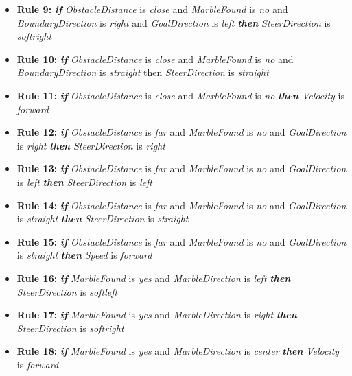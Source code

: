 \documentclass[../Head/Main.tex]{subfiles}
\begin{document}
\begin{itemize}
\item {\large \textbf{Rule 9:}} \textbf{\textit{if}} \textit{ObstacleDistance} is \textit{close} and \textit{MarbleFound} is \textit{no} and \textit{BoundaryDirection} is \textit{right} and \textit{GoalDirection} is \textit{left} \textbf{\textit{then}} \textit{SteerDirection} is \textit{softright}
 
\item {\large \textbf{Rule 10:}} \textbf{\textit{if}} \textit{ObstacleDistance} is \textit{close} and \textit{MarbleFound} is \textit{no} and \textit{BoundaryDirection} is \textit{straight} then \textit{SteerDirection} is \textit{straight}

\item {\large \textbf{Rule 11:}} \textbf{\textit{if}} \textit{ObstacleDistance} is \textit{close} and \textit{MarbleFound} is \textit{no} \textbf{\textit{then}} \textit{Velocity} is \textit{forward}

\item {\large \textbf{Rule 12:}} \textbf{\textit{if}} \textit{ObstacleDistance} is \textit{far} and \textit{MarbleFound} is \textit{no} and \textit{GoalDirection} is \textit{right} \textbf{\textit{then}} \textit{SteerDirection} is \textit{right}

\item {\large \textbf{Rule 13:}} \textbf{\textit{if}} \textit{ObstacleDistance} is \textit{far} and \textit{MarbleFound} is \textit{no} and \textit{GoalDirection} is \textit{left} \textbf{\textit{then}} \textit{SteerDirection} is \textit{left}

\item {\large \textbf{Rule 14:}} \textbf{\textit{if}} \textit{ObstacleDistance} is \textit{far} and \textit{MarbleFound} is \textit{no} and \textit{GoalDirection} is \textit{straight} \textbf{\textit{then}} \textit{SteerDirection} is \textit{straight}
 
\item {\large \textbf{Rule 15:}} \textbf{\textit{if}} \textit{ObstacleDistance} is \textit{far} and \textit{MarbleFound} is \textit{no} and \textit{GoalDirection} is \textit{straight} \textbf{\textit{then}} \textit{Speed} is \textit{forward}

\item {\large \textbf{Rule 16:}} \textbf{\textit{if}} \textit{MarbleFound} is \textit{yes} and \textit{MarbleDirection} is \textit{left} \textbf{\textit{then}} \textit{SteerDirection} is \textit{softleft}

\item {\large \textbf{Rule 17:}} \textbf{\textit{if}} \textit{MarbleFound} is \textit{yes} and \textit{MarbleDirection} is \textit{right} \textbf{\textit{then}} \textit{SteerDirection} is \textit{softright}
 
\item {\large \textbf{Rule 18:}} \textbf{\textit{if}} \textit{MarbleFound} is \textit{yes} and \textit{MarbleDirection} is \textit{center} \textbf{\textit{then}} \textit{Velocity} is \textit{forward}
\end{itemize}
\end{document}
